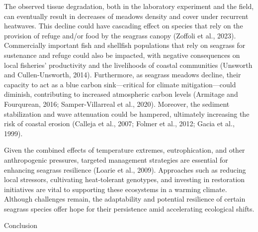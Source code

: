 \documentclass[
  letterpaper,
  DIV=11,
  numbers=noendperiod]{scrartcl}
\begin{document}
The observed tissue degradation, both in the laboratory experiment and
the field, can eventually result in decreases of meadows density and
cover under recurrent heatwaves. This decline could have cascading
effect on species that rely on the provision of refuge and/or food by
the seagrass canopy (Zoffoli et al., 2023). Commercially important fish
and shellfish populations that rely on seagrass for sustenance and
refuge could also be impacted, with negative consequences on local
fisheries' productivity and the livelihoods of coastal communities
(Unsworth and Cullen-Unsworth, 2014). Furthermore, as seagrass meadows
decline, their capacity to act as a blue carbon sink---critical for
climate mitigation---could diminish, contributing to increased
atmospheric carbon levels (Armitage and Fourqurean, 2016;
Samper-Villarreal et al., 2020). Moreover, the sediment stabilization
and wave attenuation could be hampered, ultimately increasing the risk
of coastal erosion (Calleja et al., 2007; Folmer et al., 2012; Gacia et
al., 1999).

Given the combined effects of temperature extremes, eutrophication, and
other anthropogenic pressures, targeted management strategies are
essential for enhancing seagrass resilience (Loarie et al., 2009).
Approaches such as reducing local stressors, cultivating heat-tolerant
genotypes, and investing in restoration initiatives are vital to
supporting these ecosystems in a warming climate. Although challenges
remain, the adaptability and potential resilience of certain seagrass
species offer hope for their persistence amid accelerating ecological
shifts.

Conclusion
\end{document}
